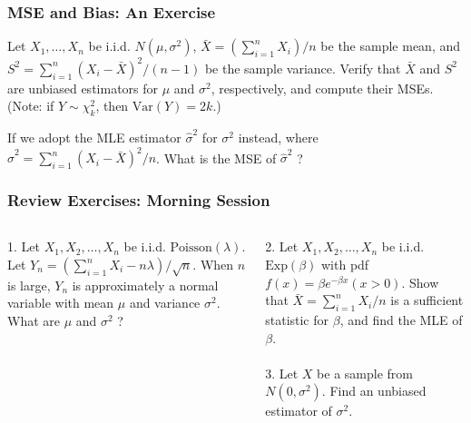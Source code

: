 \documentclass{beamer}
\begin{document}
\begin{frame}
\frametitle{MSE and Bias: An Exercise}
Let $X_1,\ldots,X_n$ be i.i.d. $N(\mu,\sigma^2)$, $\bar{X}=(\sum_{i=1}^n X_i)/n$ be the sample mean, and $S^2=\sum_{i=1}^n (X_i-\bar{X})^2/(n-1)$ be the sample variance. Verify that $\bar{X}$ and $S^2$ are unbiased estimators for $\mu$ and $\sigma^2$, respectively, and compute their MSEs.\\
(Note: if $Y \sim \chi^2_k$, then $\text{Var}(Y)=2k$.)
\vspace*{0.6in}

If we adopt the MLE estimator $\hat{\sigma}^2$ for $\sigma^2$ instead, where $\hat{\sigma}^2=\sum_{i=1}^n (X_i-\bar{X})^2/n$. What is the MSE of $\hat{\sigma}^2$ ?
\vspace*{0.6in}
\end{frame}


\begin{frame}
\frametitle{Review Exercises: Morning Session}
\begin{columns}[t]
1. Let $X_1,X_2,\ldots,X_n$ be i.i.d. $\text{Poisson}(\lambda)$. Let $Y_n = (\sum_{i=1}^n X_i -n\lambda)/\sqrt{n}$. When $n$ is large, $Y_n$ is approximately a normal variable with mean $\mu$ and variance $\sigma^2$. What are $\mu$ and $\sigma^2$ ?

2. Let $X_1,X_2,\ldots,X_n$ be i.i.d. $\text{Exp}(\beta)$ with pdf $f(x)=\beta e^{-\beta x} (x > 0)$. Show that $\bar{X} = \sum_{i=1}^n X_i/n$ is a sufficient statistic for $\beta$, and find the MLE of $\beta$.
\\~\\
3. Let $X$ be a sample from $N(0,\sigma^2)$. Find an unbiased estimator of $\sigma^2$.

\end{columns}
\end{frame}
\end{document}
